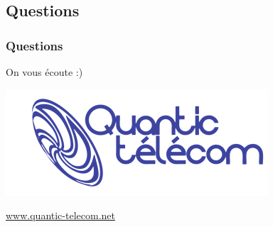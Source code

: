 \documentclass[handout]{beamer}
\newif\ifplacelogo %
\begin{document}
	\placelogofalse 
	\subsection{Questions}
		\begin{frame}
		\frametitle{Questions}
		\huge{On vous écoute :)}
		\vspace{40px}
		\begin{center}
			\includegraphics[height=.3\textheight]{images/logo.png}
		\end{center}
		\begin{center}
			\small{\underline{www.quantic-telecom.net}}
		\end{center}
		\end{frame}


\end{document}

